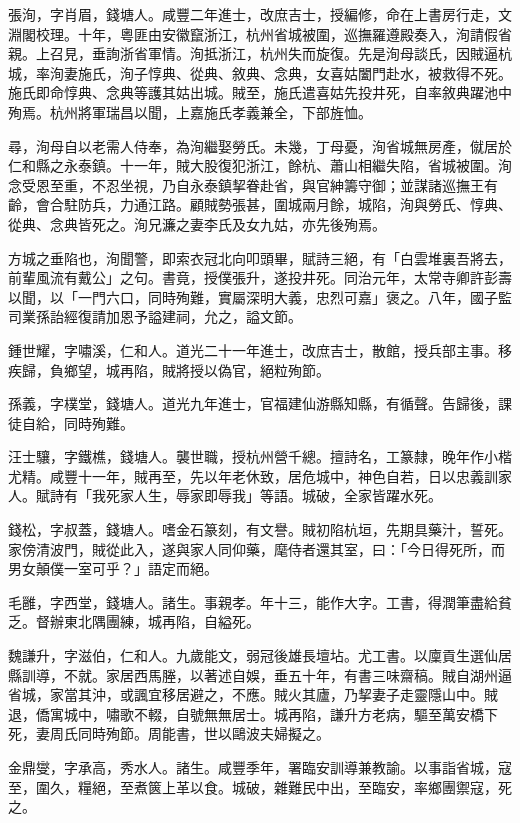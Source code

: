 \begin{pinyinscope}
張洵，字肖眉，錢塘人。咸豐二年進士，改庶吉士，授編修，命在上書房行走，文淵閣校理。十年，粵匪由安徽竄浙江，杭州省城被圍，巡撫羅遵殿奏入，洵請假省親。上召見，垂詢浙省軍情。洵抵浙江，杭州失而旋復。先是洵母談氏，因賊逼杭城，率洵妻施氏，洵子惇典、從典、敘典、念典，女喜姑闔門赴水，被救得不死。施氏即命惇典、念典等護其姑出城。賊至，施氏遣喜姑先投井死，自率敘典躍池中殉焉。杭州將軍瑞昌以聞，上嘉施氏孝義兼全，下部旌恤。

尋，洵母自以老需人侍奉，為洵繼娶勞氏。未幾，丁母憂，洵省城無房產，僦居於仁和縣之永泰鎮。十一年，賊大股復犯浙江，餘杭、蕭山相繼失陷，省城被圍。洵念受恩至重，不忍坐視，乃自永泰鎮挈眷赴省，與官紳籌守御；並謀諸巡撫王有齡，會合駐防兵，力通江路。顧賊勢張甚，圍城兩月餘，城陷，洵與勞氏、惇典、從典、念典皆死之。洵兄濂之妻李氏及女九姑，亦先後殉焉。

方城之垂陷也，洵聞警，即索衣冠北向叩頭畢，賦詩三絕，有「白雲堆裏吾將去，前輩風流有戴公」之句。書竟，授僕張升，遂投井死。同治元年，太常寺卿許彭壽以聞，以「一門六口，同時殉難，實屬深明大義，忠烈可嘉」褒之。八年，國子監司業孫詒經復請加恩予謚建祠，允之，謚文節。

鍾世耀，字嘯溪，仁和人。道光二十一年進士，改庶吉士，散館，授兵部主事。移疾歸，負鄉望，城再陷，賊將授以偽官，絕粒殉節。

孫義，字樸堂，錢塘人。道光九年進士，官福建仙游縣知縣，有循聲。告歸後，課徒自給，同時殉難。

汪士驤，字鐵樵，錢塘人。襲世職，授杭州營千總。擅詩名，工篆隸，晚年作小楷尤精。咸豐十一年，賊再至，先以年老休致，居危城中，神色自若，日以忠義訓家人。賦詩有「我死家人生，辱家即辱我」等語。城破，全家皆躍水死。

錢松，字叔蓋，錢塘人。嗜金石篆刻，有文譽。賊初陷杭垣，先期具藥汁，誓死。家傍清波門，賊從此入，遂與家人同仰藥，麾侍者還其室，曰：「今日得死所，而男女顛僕一室可乎？」語定而絕。

毛雝，字西堂，錢塘人。諸生。事親孝。年十三，能作大字。工書，得潤筆盡給貧乏。督辦東北隅團練，城再陷，自縊死。

魏謙升，字滋伯，仁和人。九歲能文，弱冠後雄長壇坫。尤工書。以廩貢生選仙居縣訓導，不就。家居西馬塍，以著述自娛，垂五十年，有書三味齋稿。賊自湖州逼省城，家當其沖，或諷宜移居避之，不應。賊火其廬，乃挈妻子走靈隱山中。賊退，僑寓城中，嘯歌不輟，自號無無居士。城再陷，謙升方老病，驅至萬安橋下死，妻周氏同時殉節。周能書，世以鷗波夫婦擬之。

金鼎燮，字承高，秀水人。諸生。咸豐季年，署臨安訓導兼教諭。以事詣省城，寇至，圍久，糧絕，至煮篋上革以食。城破，雜難民中出，至臨安，率鄉團禦寇，死之。


\end{pinyinscope}
